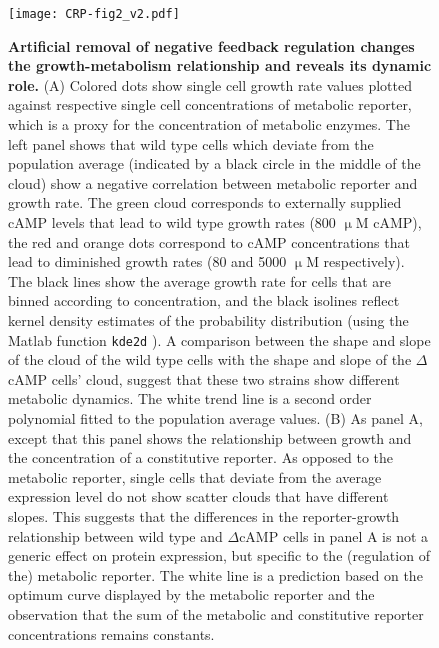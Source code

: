 \begin{figure}
	\centering
	\texttt{[image: CRP-fig2\_v2.pdf]}
	\caption{ 
		\textbf{Artificial removal of negative feedback regulation changes the growth-metabolism relationship and reveals its dynamic role.}		
		(A) Colored dots show single cell growth rate values plotted against respective single cell concentrations of metabolic reporter, which is a proxy for the concentration of metabolic enzymes. 
		The left panel shows that wild type cells which deviate from the population average (indicated by a black circle in the middle of the cloud) show a negative correlation between metabolic reporter and growth rate.
    	The green cloud corresponds to externally supplied cAMP levels that lead to wild type growth rates (800 $\upmu$M cAMP), the 
        red and orange dots correspond to cAMP concentrations that lead to diminished growth rates (80 and 5000 $\upmu$M respectively).
     	The black lines show the average growth rate for cells that are binned according to concentration, and the black isolines reflect kernel density estimates of the probability distribution (using the Matlab function \texttt{kde2d} \cite{Botev2010}).
        A comparison between the shape and slope of the cloud of the wild type cells with the 
        shape and slope of the  $\Delta$cAMP cells' cloud,
        suggest that these two strains show different metabolic dynamics.
        The white trend line is a second order polynomial fitted to the population average values.
		(B) As panel A, except that this panel shows the relationship between growth and the concentration of a constitutive reporter. 
		As opposed to the metabolic reporter, 
        single cells that deviate from the average expression level do not show scatter clouds that have different slopes.
		This suggests that the differences in the reporter-growth relationship between wild type and $\Delta$cAMP cells in panel A is not a generic effect on protein expression, 
        but specific to the (regulation of the) metabolic reporter.
        The white line is a prediction based on the optimum curve displayed by the metabolic reporter and the observation that the sum of the metabolic and constitutive reporter concentrations remains constants.
	}
	\label{fig:CRP:fig2}
\end{figure}



